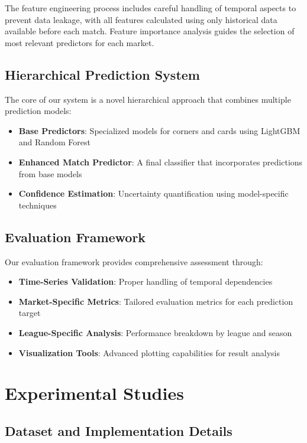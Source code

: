 \documentclass[conference]{IEEEtran}
\begin{document}
The feature engineering process includes careful handling of temporal aspects to prevent data leakage, with all features calculated using only historical data available before each match. Feature importance analysis guides the selection of most relevant predictors for each market.

\subsection{Hierarchical Prediction System}
The core of our system is a novel hierarchical approach that combines multiple prediction models:

\begin{itemize}
    \item \textbf{Base Predictors}: Specialized models for corners and cards using LightGBM and Random Forest
    \item \textbf{Enhanced Match Predictor}: A final classifier that incorporates predictions from base models
    \item \textbf{Confidence Estimation}: Uncertainty quantification using model-specific techniques
\end{itemize}

\subsection{Evaluation Framework}
Our evaluation framework provides comprehensive assessment through:

\begin{itemize}
    \item \textbf{Time-Series Validation}: Proper handling of temporal dependencies
    \item \textbf{Market-Specific Metrics}: Tailored evaluation metrics for each prediction target
    \item \textbf{League-Specific Analysis}: Performance breakdown by league and season
    \item \textbf{Visualization Tools}: Advanced plotting capabilities for result analysis
\end{itemize}

\section{Experimental Studies}
\subsection{Dataset and Implementation Details}
\end{document}
